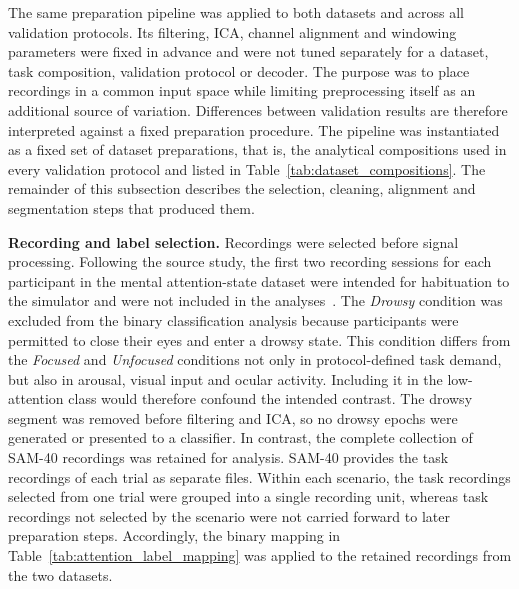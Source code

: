\documentclass[10pt,letterpaper]{article}
\newcommand{\rev}[1]{#1}
\begin{document}
\rev{The same preparation pipeline was applied to
both datasets and across all validation protocols.
Its filtering, ICA, channel
alignment and windowing parameters were fixed in advance and were not tuned
separately for a dataset, task composition, validation protocol or decoder. The
purpose was to place recordings in a common input space while limiting
preprocessing itself as an additional source of variation. Differences between
validation results are therefore interpreted against a fixed preparation
procedure. The pipeline was instantiated as a fixed set of dataset
preparations, that is, the analytical compositions used in every validation
protocol and listed in
Table~\ref{tab:dataset_compositions}. The remainder of this subsection
describes the selection, cleaning, alignment and segmentation steps that
produced them.}



\rev{\textbf{Recording and label selection.} Recordings were selected
before signal processing. Following the source study, the first two recording
sessions for each participant in the mental attention-state dataset were
intended for habituation to the simulator and were not included in the
analyses~\cite{aci2019attention}. The \textit{Drowsy} condition was excluded
from the binary classification analysis because participants were
permitted to close their eyes and enter a drowsy state. This condition differs
from the \textit{Focused} and \textit{Unfocused} conditions not only in
protocol-defined task demand, but also in arousal, visual input and ocular
activity. Including it in the low-attention class would therefore confound the
intended contrast. The drowsy segment was removed before filtering and ICA, so
no drowsy epochs were generated or presented to a classifier. In contrast, the complete collection of SAM-40 recordings was
retained for analysis. SAM-40 provides the task recordings of each trial as
separate files. Within each scenario, the task recordings selected from one
trial were grouped into a single recording unit, whereas task recordings not
selected by the scenario were not carried forward to later preparation steps.
Accordingly, the binary mapping in Table~\ref{tab:attention_label_mapping} was applied to the
retained recordings from the two datasets.}
\end{document}

